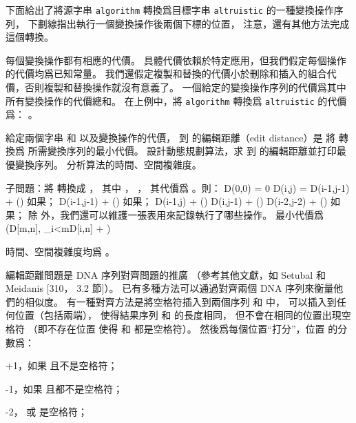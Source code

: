 下面給出了將源字串 {\tt algorithm} 轉換爲目標字串 {\tt altruistic} 的一種變換操作序列，
下劃線指出執行一個變換操作後兩個下標的位置，
注意，還有其他方法完成這個轉換。



每個變換操作都有相應的代價。
具體代價依賴於特定應用，但我們假定每個操作的代價均爲已知常量。
我們還假定複製和替換的代價小於刪除和插入的組合代價，否則複製和替換操作就沒有意義了。
一個給定的變換操作序列的代價爲其中所有變換操作的代價總和。
在上例中，將 {\tt algorithm} 轉換爲 {\tt altruistic} 的代價爲：
。

\startigNum
\startitem
給定兩個字串  和  以及變換操作的代價，
  到  的{\EMP 編輯距離}（edit distance）是
將  轉換爲  所需變換序列的最小代價。
設計動態規劃算法，求  到  的編輯距離並打印最優變換序列。
分析算法的時間、空間複雜度。
\stopitem
\stopigNum

\startANSWER
子問題：將  轉換成 ，
其中 ， ，
其代價爲 。則：
\startformula\startmathalignment
\NC D(0,0) \NC = 0 \NR
\NC D(i,j) \NC = \min\startcases
\NC D(i-1,j-1) + \COST() \NC 如果； \NR
\NC D(i-1,j-1) + \COST() \NC 如果； \NR
\NC D(i-1,j) + \COST() \NC \NR
\NC D(i,j-1) + \COST() \NC \NR
\NC D(i-2,j-2) + \COST() \NC 如果\m{[x_{i-1}x_i]=[y_i y_{i-1}]}； \NR
\stopcases \NR
\stopmathalignment\stopformula
除  外，我們還可以維護一張表用來記錄執行了哪些操作。
最小代價爲
\startformula
\min(D[m,n], \min_{i<m}D[i,n] + \COST[\text{終止}])
\stopformula

時間、空間複雜度均爲 。
\stopANSWER

編輯距離問題是 DNA 序列對齊問題的推廣
（參考其他文獻，如 Setubal 和 Meidanis [310， 3.2 節]）。
已有多種方法可以通過對齊兩個 DNA 序列來衡量他們的相似度。
有一種對齊方法是將空格符插入到兩個序列  和  中，
可以插入到任何位置（包括兩端），
使得結果序列  和  的長度相同，
但不會在相同的位置出現空格符
（即不存在位置  使得  和  都是空格符）。
然後爲每個位置“打分”，位置  的分數爲：
\startigBase
\item +1，如果  且不是空格符；
\item -1，如果  且都不是空格符；
\item -2，  或  是空格符；
\stopigBase

